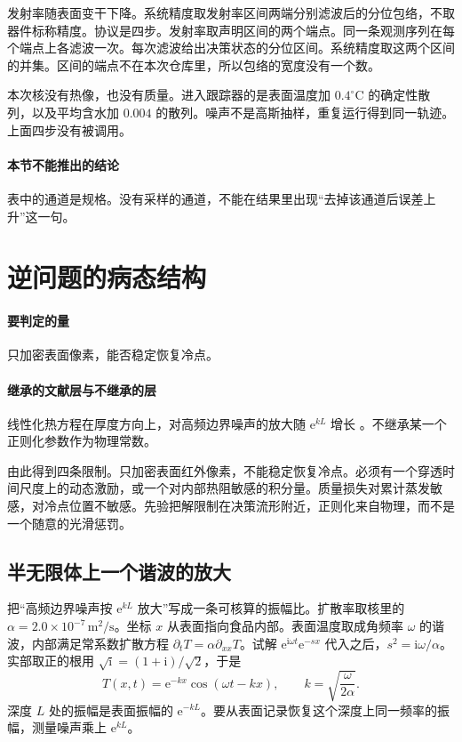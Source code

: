 发射率随表面变干下降。系统精度取发射率区间两端分别滤波后的分位包络，不取器件标称精度。协议是四步。发射率取声明区间的两个端点。同一条观测序列在每个端点上各滤波一次。每次滤波给出决策状态的分位区间。系统精度取这两个区间的并集。区间的端点不在本次仓库里，所以包络的宽度没有一个数。

本次核没有热像，也没有质量。进入跟踪器的是表面温度加 \(0.4^\circ\mathrm{C}\) 的确定性散列，以及平均含水加 \(0.004\) 的散列。噪声不是高斯抽样，重复运行得到同一轨迹。上面四步没有被调用。

\paragraph{本节不能推出的结论}
表中的通道是规格。没有采样的通道，不能在结果里出现“去掉该通道后误差上升”这一句。

\section{逆问题的病态结构}

\paragraph{要判定的量}
只加密表面像素，能否稳定恢复冷点。

\paragraph{继承的文献层与不继承的层}
线性化热方程在厚度方向上，对高频边界噪声的放大随 \(\mathrm{e}^{kL}\) 增长 \cite{ozisik2000}。不继承某一个正则化参数作为物理常数。

由此得到四条限制。只加密表面红外像素，不能稳定恢复冷点。必须有一个穿透时间尺度上的动态激励，或一个对内部热阻敏感的积分量。质量损失对累计蒸发敏感，对冷点位置不敏感。先验把解限制在决策流形附近，正则化来自物理，而不是一个随意的光滑惩罚。

\subsection{半无限体上一个谐波的放大}

把“高频边界噪声按 \(\mathrm{e}^{kL}\) 放大”写成一条可核算的振幅比。扩散率取核里的 \(\alpha=2.0\times 10^{-7}\,\mathrm{m}^2/\mathrm{s}\)。坐标 \(x\) 从表面指向食品内部。表面温度取成角频率 \(\omega\) 的谐波，内部满足常系数扩散方程 \(\partial_t T=\alpha\partial_{xx}T\)。试解 \(\mathrm{e}^{\mathrm{i}\omega t}\mathrm{e}^{-sx}\) 代入之后，\(s^2=\mathrm{i}\omega/\alpha\)。实部取正的根用 \(\sqrt{\mathrm{i}}=(1+\mathrm{i})/\sqrt{2}\)，于是
\begin{equation}
\label{eq:halfspace}
T(x,t)=\mathrm{e}^{-kx}\cos(\omega t-kx),
\qquad
k=\sqrt{\frac{\omega}{2\alpha}}.
\end{equation}
深度 \(L\) 处的振幅是表面振幅的 \(\mathrm{e}^{-kL}\)。要从表面记录恢复这个深度上同一频率的振幅，测量噪声乘上 \(\mathrm{e}^{kL}\)。

